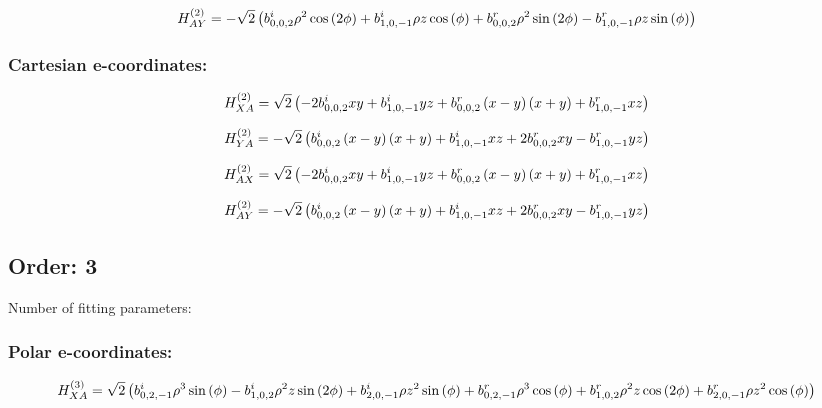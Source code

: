 \documentclass[fleqn]{article}
\begin{document}
\begin{dmath*}
H_{AY}^{(2)}=-  \sqrt{2} \left( b^{i}_{0,0,2} \rho^{2} \cos{\left (2 \phi \right )} +  b^{i}_{1,0,-1} \rho z \cos{\left (\phi \right )} +  b^{r}_{0,0,2} \rho^{2} \sin{\left (2 \phi \right )} -  b^{r}_{1,0,-1} \rho z \sin{\left (\phi \right )}\right)\\
\end{dmath*}
\subsubsection*{Cartesian e-coordinates:}

\begin{dmath*}
H_{XA}^{(2)}=\sqrt{2} \left(- 2 b^{i}_{0,0,2} x y + b^{i}_{1,0,-1} y z + b^{r}_{0,0,2} \left(x - y\right) \left(x + y\right) + b^{r}_{1,0,-1} x z\right)\\
\end{dmath*}

\begin{dmath*}
H_{YA}^{(2)}=-  \sqrt{2} \left( b^{i}_{0,0,2} \left(x - y\right) \left(x + y\right) +  b^{i}_{1,0,-1} x z + 2 b^{r}_{0,0,2} x y -  b^{r}_{1,0,-1} y z\right)\\
\end{dmath*}

\begin{dmath*}
H_{AX}^{(2)}=\sqrt{2} \left(- 2 b^{i}_{0,0,2} x y + b^{i}_{1,0,-1} y z + b^{r}_{0,0,2} \left(x - y\right) \left(x + y\right) + b^{r}_{1,0,-1} x z\right)\\
\end{dmath*}

\begin{dmath*}
H_{AY}^{(2)}=-  \sqrt{2} \left( b^{i}_{0,0,2} \left(x - y\right) \left(x + y\right) +  b^{i}_{1,0,-1} x z + 2 b^{r}_{0,0,2} x y -  b^{r}_{1,0,-1} y z\right)\\
\end{dmath*}
\subsection{Order: 3}
Number of fitting parameters: 
\subsubsection*{Polar e-coordinates:}

\begin{dmath*}
H_{XA}^{(3)}=\sqrt{2} \left(b^{i}_{0,2,-1} \rho^{3} \sin{\left (\phi \right )} - b^{i}_{1,0,2} \rho^{2} z \sin{\left (2 \phi \right )} + b^{i}_{2,0,-1} \rho z^{2} \sin{\left (\phi \right )} + b^{r}_{0,2,-1} \rho^{3} \cos{\left (\phi \right )} + b^{r}_{1,0,2} \rho^{2} z \cos{\left (2 \phi \right )} + b^{r}_{2,0,-1} \rho z^{2} \cos{\left (\phi \right )}\right)\\
\end{dmath*}
\end{document}
